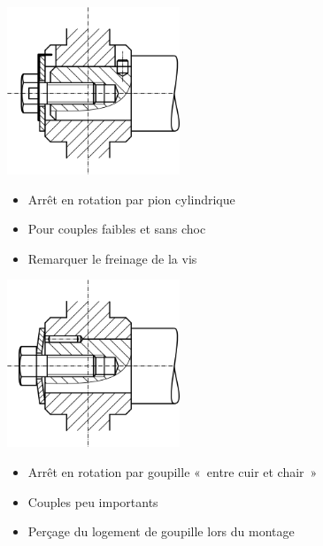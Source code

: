 \documentclass[11pt,oneside]{article}
\begin{document}
\noindent\begin{minipage}[c]{.45\linewidth}
 \begin{center}
  \includegraphics[height=5cm]{png/Fig1}
\end{center}

\begin{itemize}
\item Arrêt en rotation par pion cylindrique
\item Pour couples faibles et sans choc
\item Remarquer le freinage de la vis
\end{itemize}
\end{minipage} \hfill
\noindent\begin{minipage}[c]{.45\linewidth}
 \begin{center}
  \includegraphics[height=5cm]{png/Fig3}
 \end{center}

\begin{itemize}
\item Arrêt en rotation par goupille «~entre cuir et chair~»
\item Couples peu importants
\item Perçage du logement de goupille lors du montage
\end{itemize}
\end{minipage} 

\noindent\begin{minipage}[c]{.9\linewidth}
\end{minipage} 
\end{document}
